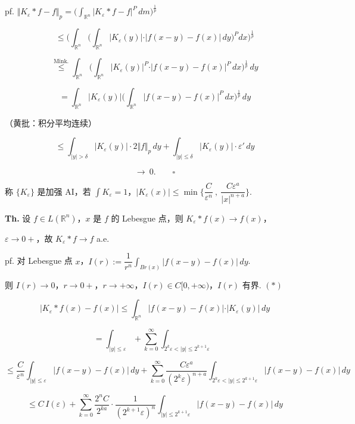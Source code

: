 \documentclass[11pt]{ctexart}
\theoremstyle{definition}
\begin{document}
pf. $\Vert K_\varepsilon \ast f - f\Vert_p = \Big( \int_{\mathbb{R}^n} \vert K_\varepsilon \ast f - f\vert^P \, dm \Big)^{\frac{1}{p}}$

\[
\leq \Big( \int_{\mathbb{R}^n} \Big( \int_{\mathbb{R}^n} \vert K_\varepsilon(y)\vert \cdot \vert f(x-y) - f(x)\vert \, dy \Big)^P dx \Big)^{\frac{1}{p}}
\]

\[
\overset{\text{Mink.}}{\leq} \int_{\mathbb{R}^n} \Big( \int_{\mathbb{R}^n} \vert K_\varepsilon(y)\vert^P \cdot \vert f(x-y) - f(x)\vert^P \, dx \Big)^{\frac{1}{p}} \, dy
\]

\[
= \int_{\mathbb{R}^n} \vert K_\varepsilon(y)\vert \Big( \int_{\mathbb{R}^n} \vert f(x-y) - f(x)\vert^P \, dx \Big)^{\frac{1}{p}} \, dy
\]

（黄批：积分平均连续）

\[
\leq \int_{\vert y\vert > \delta} \vert K_\varepsilon(y)\vert \cdot 2\Vert f\Vert_p \, dy + \int_{\vert y\vert \leq \delta} \vert K_\varepsilon(y)\vert \cdot \varepsilon' \, dy
\]

\[
\to\ 0. \qquad \square
\]

称 $\{K_\varepsilon\}$ 是加强 AI，若 $\displaystyle\int K_\varepsilon = 1$，$\vert K_\varepsilon(x)\vert \leq \min\Big\{ \dfrac{C}{\varepsilon^n} \ ,\ \dfrac{C\varepsilon^a}{\vert x\vert^{n+a}} \Big\}$.

\textbf{Th.} 设 $f \in L(\mathbb{R}^n)$，$x$ 是 $f$ 的 Lebesgue 点，则 $K_\varepsilon \ast f(x) \to f(x)$，

$\varepsilon \to 0+$，故 $K_\varepsilon \ast f \to f$  a.e.

pf. 对 Lebesgue 点 $x$，$I(r) := \dfrac{1}{r^n} \displaystyle\int_{Br(x)} \vert f(x-y) - f(x)\vert \, dy$.

则 $I(r) \to 0$，$r \to 0+$，$r \to +\infty$，$I(r) \in C[0, +\infty)$，$I(r)$ 有界.  $(\ast)$

\[
\vert K_\varepsilon \ast f(x) - f(x)\vert \leq \int_{\mathbb{R}^n} \vert f(x-y) - f(x)\vert \cdot \vert K_\varepsilon(y)\vert \, dy
\]

\[
= \int_{\vert y\vert \leq \varepsilon} + \sum_{k=0}^{\infty} \int_{2^k \varepsilon < \vert y\vert \leq 2^{k+1} \varepsilon}
\]

\[
\leq \frac{C}{\varepsilon^n} \int_{\vert y\vert \leq \varepsilon} \vert f(x-y) - f(x)\vert \, dy + \sum_{k=0}^{\infty} \frac{C\varepsilon^a}{(2^k \varepsilon)^{n+a}} \int_{2^k \varepsilon < \vert y\vert \leq 2^{k+1} \varepsilon} \vert f(x-y) - f(x)\vert \, dy
\]

\[
\leq C\, I(\varepsilon) + \sum_{k=0}^{\infty} \frac{2^n C}{2^{ka}} \cdot \frac{1}{(2^{k+1}\varepsilon)^n} \int_{\vert y\vert \leq 2^{k+1} \varepsilon} \vert f(x-y) - f(x)\vert \, dy
\]
\end{document}
